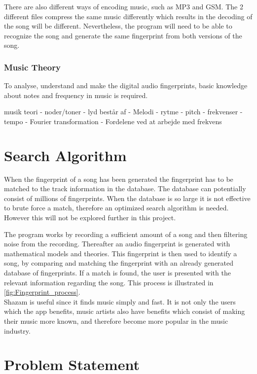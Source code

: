 There are also different ways of encoding music, such as MP3 and GSM. The 2 different files compress the same music differently which results in the decoding of the song will be different. Nevertheless, the program will need to be able to recognize the song and generate the same fingerprint from both versions of the song.\\
\subsubsection{Music Theory}


To analyse, understand and make the digital audio fingerprints, basic knowledge about notes and frequency in music is required.  




musik teori
 - noder/toner
 - lyd består af
    - Melodi
    - rytme
    - pitch
    - frekvenser
    -tempo
- Fourier transformation
    - Fordelene ved at arbejde med frekvens 


\section{Search Algorithm}
When the fingerprint of a song has been generated the fingerprint has to be matched to the track information in the database. The database can potentially consist of millions of fingerprints. When the database is so large it is not effective to brute force a match, therefore an optimized search algorithm is needed. However this will not be explored further in this project. \cite{haitsma2003highly} 

The program works by recording a sufficient amount of a song and then filtering noise from the recording. 
Thereafter an audio fingerprint is generated with mathematical models and theories. This fingerprint is then used to identify a song, by comparing and matching the fingerprint with an already generated database of fingerprints. If a match is found, the user is presented with the relevant information regarding the song. This process is illustrated in \autoref{fig:Fingerprint_process}. \cite{ShazamDescription}\\

Shazam is useful since it finds music simply and fast. It is not only the users which the app benefits, music artists also have benefits which consist of making their music more known, and therefore become more popular in the music industry. \cite{wang2003industrial} 







\section{Problem Statement}